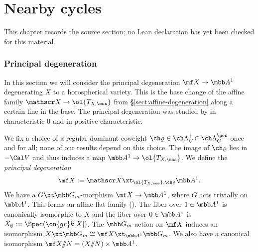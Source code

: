 \chapter{Nearby cycles}
\label{intersection-complexes-unramified-l-factors-chapter-08}

\begin{remark}
\label{intersection-complexes-unramified-l-factors-chapter-08-source}
This chapter records the source section; no Lean declaration has yet been checked for this material.
\notready
\end{remark}

\label{sect:nearby}

\subsection{Principal degeneration} \label{sect:degeneration}

In this section we will consider the principal degeneration $\mf X \to \mbb A^1$
degenerating $X$ to a horospherical variety. This is the base change of
the affine family $\mathscr X \to \ol{T_{X,\mss}}$ from \S\ref{sect:affine-degeneration}
along a certain line in the base. The principal degeneration
was studied by \cite{Pop86} in characteristic $0$ and \cite{Grosshans92} in positive
characteristic.

We fix a choice of
a regular dominant coweight $\ch\varrho \in \ch\Lambda^+_G \cap \ch\Lambda^\pos_G$
once and for all; none of our results depend on this choice.
The image of $\ch\varrho$ lies in $-\Cal V$
and thus induces a map $\mbb A^1 \to \ol{T_{X,\mss}}$.
We define the \emph{principal degeneration}
\[ \mf X := \mathscr X \xt_{\ol{T_{X,\mss}}, \ch\varrho} \mbb A^1. \]
We have a $G \xt \mbb G_m$-morphism
$\mf X \to \mbb A^1$, where $G$ acts trivially on $\mbb A^1$.
This forms an affine flat family (\cite[Proposition 9]{Pop86}).
The fiber over $1 \in \mbb A^1$ is canonically isomorphic to
$X$ and the fiber over $0\in \mbb A^1$ is $X_\emptyset := \Spec(\on{gr} k[X])$.
The $\mbb G_m$-action on $\mf X$ induces an isomorphism
$X \xt \mbb G_m \cong \mf X \xt_{\mbb A^1} \mbb G_m$.
We also have a canonical isomorphism
$\mf X /\!\!/ N = (X/\!\!/N) \times \mbb A^1$.

